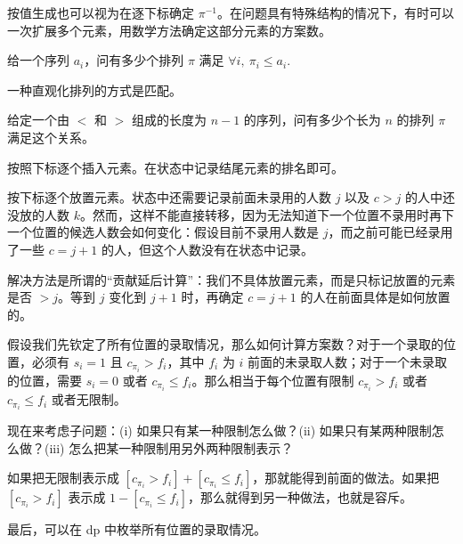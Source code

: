 按值生成也可以视为在逐下标确定 $\pi^{-1}$。在问题具有特殊结构的情况下，有时可以一次扩展多个元素，用数学方法确定这部分元素的方案数。

\begin{example}[经典问题]
    给一个序列 $a_i$，问有多少个排列 $\pi$ 满足 $\forall i,\ \pi_i\le a_i$.
\end{example}
\begin{remark}
    一种直观化排列的方式是匹配。
\end{remark}

\begin{example}
    给定一个由 $<$ 和 $>$ 组成的长度为 $n-1$ 的序列，问有多少个长为 $n$ 的排列 $\pi$ 满足这个关系。
\end{example}
\begin{solution}
    按照下标逐个插入元素。在状态中记录结尾元素的排名即可。
\end{solution}

\begin{example}[{[CSP-S 2025] 员工招聘}]
    
\end{example}
\begin{solution}
    按下标逐个放置元素。状态中还需要记录前面未录用的人数 $j$ 以及 $c>j$ 的人中还没放的人数 $k$。然而，这样不能直接转移，因为无法知道下一个位置不录用时再下一个位置的候选人数会如何变化：假设目前不录用人数是 $j$，而之前可能已经录用了一些 $c=j+1$ 的人，但这个人数没有在状态中记录。
    
    解决方法是所谓的“贡献延后计算”：我们不具体放置元素，而是只标记放置的元素是否 $>j$。等到 $j$ 变化到 $j+1$ 时，再确定 $c=j+1$ 的人在前面具体是如何放置的。
\end{solution}
\begin{solution}[另一个视角]
        假设我们先钦定了所有位置的录取情况，那么如何计算方案数？对于一个录取的位置，必须有 $s_i=1$ 且 $c_{\pi_i}>f_i$，其中 $f_i$ 为 $i$ 前面的未录取人数；对于一个未录取的位置，需要 $s_i=0$ 或者 $c_{\pi_i}\le f_i$。那么相当于每个位置有限制 $c_{\pi_i}>f_i$ 或者 $c_{\pi_i}\le f_i$ 或者无限制。

现在来考虑子问题：(i) 如果只有某一种限制怎么做？(ii) 如果只有某两种限制怎么做？(iii) 怎么把某一种限制用另外两种限制表示？

如果把无限制表示成 $[c_{\pi_i}>f_i]+[c_{\pi_i}\le f_i]$，那就能得到前面的做法。如果把 $[c_{\pi_i}>f_i]$ 表示成 $1-[c_{\pi_i}\le f_i]$，那么就得到另一种做法，也就是容斥。

最后，可以在 dp 中枚举所有位置的录取情况。    
\end{solution}

